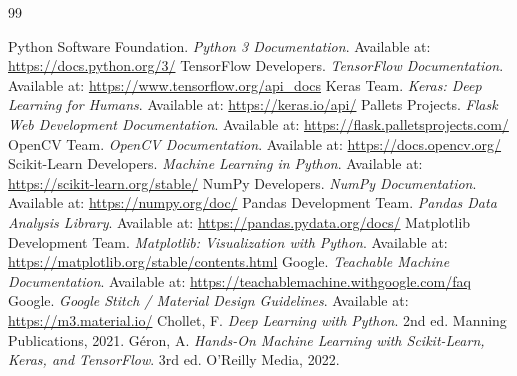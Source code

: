 \renewcommand{\bibname}{REFERENCES}
\begin{thebibliography}{99}
\sloppy
{}
     Python Software Foundation. \textit{Python 3 Documentation}. Available at: \url{https://docs.python.org/3/}
     TensorFlow Developers. \textit{TensorFlow Documentation}. Available at: \url{https://www.tensorflow.org/api_docs}
     Keras Team. \textit{Keras: Deep Learning for Humans}. Available at: \url{https://keras.io/api/}
     Pallets Projects. \textit{Flask Web Development Documentation}. Available at: \url{https://flask.palletsprojects.com/}
     OpenCV Team. \textit{OpenCV Documentation}. Available at: \url{https://docs.opencv.org/}
     Scikit-Learn Developers. \textit{Machine Learning in Python}. Available at: \url{https://scikit-learn.org/stable/}
     NumPy Developers. \textit{NumPy Documentation}. Available at: \url{https://numpy.org/doc/}
     Pandas Development Team. \textit{Pandas Data Analysis Library}. Available at: \url{https://pandas.pydata.org/docs/}
     Matplotlib Development Team. \textit{Matplotlib: Visualization with Python}. Available at: \url{https://matplotlib.org/stable/contents.html}
     Google. \textit{Teachable Machine Documentation}. Available at: \url{https://teachablemachine.withgoogle.com/faq}
     Google. \textit{Google Stitch / Material Design Guidelines}. Available at: \url{https://m3.material.io/}
     Chollet, F. \textit{Deep Learning with Python}. 2nd ed. Manning Publications, 2021.
     Géron, A. \textit{Hands-On Machine Learning with Scikit-Learn, Keras, and TensorFlow}. 3rd ed. O'Reilly Media, 2022.
\end{thebibliography}
